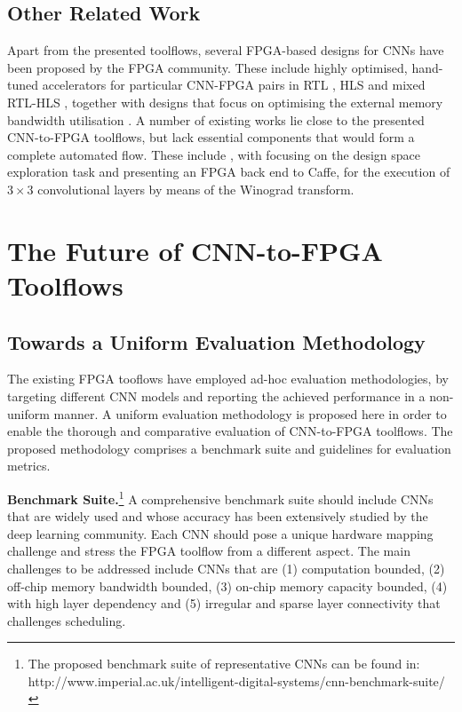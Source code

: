 \documentclass[format=acmsmall, review=false, screen=true]{acmart}
\begin{document}
\subsection{Other Related Work}{\color{black}
Apart from the presented toolflows, several FPGA-based designs for CNNs have been proposed by the FPGA community. These include highly optimised, hand-tuned accelerators for particular CNN-FPGA pairs in RTL \cite{Farabet_2010}\cite{Dundar_2017}\cite{Li2017fpl}, HLS \cite{Aydonat_2017}\cite{Kim2017legupdnn} and mixed RTL-HLS \cite{Zhang_2017}, together with designs that focus on optimising the external memory bandwidth utilisation \cite{Alwani2016micro}\cite{Yongming2017}. A number of existing works lie close to the presented CNN-to-FPGA toolflows, but lack essential components that would form a complete automated flow. These include \cite{Motamedi_2016}\cite{Suda_2016}\cite{Motamedi2017placid}\cite{DiCecco2016fpt}, with \cite{Motamedi_2016}\cite{Suda_2016}\cite{Motamedi2017placid} focusing on the design space exploration task and \cite{DiCecco2016fpt} presenting an FPGA back end to Caffe, for the execution of $3 \times 3$ convolutional layers by means of the Winograd transform.
}

\section{The Future of CNN-to-FPGA Toolflows}


\subsection{Towards a Uniform Evaluation Methodology}
\label{unif_eval_section}

The existing FPGA tooflows have employed ad-hoc evaluation methodologies, by targeting different CNN models and reporting the achieved performance in a non-uniform manner. A uniform evaluation methodology is proposed here in order to enable the thorough and comparative evaluation of CNN-to-FPGA toolflows. The proposed methodology comprises a benchmark suite and guidelines for evaluation metrics. 



\textbf{Benchmark Suite.}\footnote{The proposed benchmark suite of representative CNNs can be found in: http://www.imperial.ac.uk/intelligent-digital-systems/cnn-benchmark-suite/} 
A comprehensive benchmark suite should include CNNs that are widely used and whose accuracy has been extensively studied by the deep learning community. Each CNN should pose a unique hardware mapping challenge and stress the FPGA toolflow from a different aspect. The main challenges to be addressed include CNNs that are (1) computation bounded, (2) off-chip memory bandwidth bounded, (3) on-chip memory capacity bounded, (4) with high layer dependency and (5) irregular and sparse layer connectivity that challenges scheduling.
\end{document}
